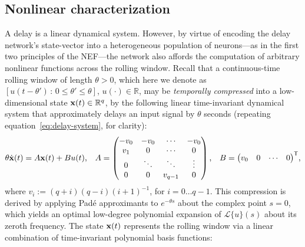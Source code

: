 \subsection{Nonlinear characterization}
\label{sec:delay-nonlinear}

A delay is a linear dynamical system.
However, by virtue of encoding the delay network's state-vector into a heterogeneous population of neurons---as in the first two principles of the NEF---the network also affords the computation of arbitrary nonlinear functions across the rolling window.
Recall that a continuous-time rolling window of length $\theta > 0$, which here we denote as $\left[ u(t - \theta') \,:\, 0 \le \theta' \le \theta \right]$, $u(\cdot) \in \mathbb{R}$, may be \emph{temporally compressed} into a low-dimensional state $\mathbf{x}(t) \in \mathbb{R}^q$, by the following linear time-invariant dynamical system that approximately delays an input signal by $\theta$ seconds (repeating equation~\ref{eq:delay-system}, for clarity):
\begin{equation*}
  \theta \dot{\mathbf{x}}(t) = A\mathbf{x}(t) + Bu(t) \text{,} \quad
  A = \begin{pmatrix} -v_0 & -v_0 & \cdots & -v_0 \\ v_1 & 0 & \cdots & 0 \\ 0 & \ddots & \ddots & \vdots \\ 0 & 0 & v_{q-1} & 0\end{pmatrix} \text{,} \quad 
  B = {\begin{pmatrix} v_0 & 0 & \cdots & 0\end{pmatrix}}^\mathsf{T} \text{,} 
\end{equation*}
where $v_i := (q+i)(q-i)(i+1)^{-1}$, %
for $i = 0 \ldots q-1$.
This compression is derived by applying Pad\'e approximants to $e^{-\theta s}$ about the complex point $s=0$, which yields an optimal low-degree polynomial expansion of $\mathcal{L}\{u\}(s)$ about its zeroth frequency.
The state $\mathbf{x}(t)$ represents the rolling window via a linear combination of time-invariant polynomial basis functions:
